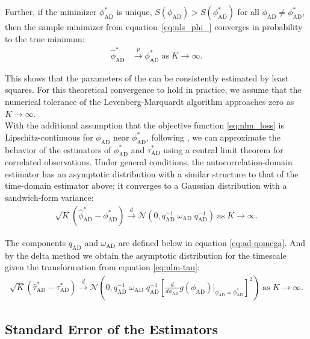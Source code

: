 \documentclass[9pt]{article}
\newcommand{\phiad}{\phi_{\scriptscriptstyle\text{AD}}}
\newcommand{\hatphiad}{\hat{\phi}^*_{\scriptscriptstyle\text{AD}}}
\newcommand{\tauad}{\tau_{\scriptscriptstyle\text{AD}}}
\newcommand{\hattauad}{\hat{\tau}^*_{\scriptscriptstyle\text{AD}}}
\newcommand{\qad}{q_{\scriptscriptstyle\text{AD}}}
\newcommand{\omegaad}{\omega_{\scriptscriptstyle\text{AD}}}
\begin{document}
\noindent Further, if the minimizer $\phiad^*$ is unique, $S(\phiad) > S(\phiad^*)$ for all $\phiad \ne \phiad^*$, then the sample minimizer from equation~\eqref{eq:nls_phi_} converges in probability to the true minimum:
\begin{align}
\hatphiad &\overset{p}{\to} \phiad^* \;\text{as}\;K\to\infty.
\end{align}

\noindent This shows that the parameters of the  can be consistently estimated by least squares. For this theoretical convergence to hold in practice, we assume that the numerical tolerance of the Levenberg-Marquardt algorithm approaches zero as $K \to \infty$.\\

With the additional assumption that the objective function \eqref{eq:nlm_loss} is Lipschitz-continuous for $\phiad$ near $\phiad^*$, following \citet[Theorem~23.2]{hansen_econometrics_2022}, we can approximate the behavior of the estimators of $\phiad^*$ and $\tauad^*$ using a central limit theorem for correlated observations. Under general conditions, the autocorrelation-domain estimator has an asymptotic distribution with a similar structure to that of the time-domain estimator above; it converges to a Gaussian distribution with a sandwich-form variance:
\begin{align}\label{eq:nls-phi-clt}
    \sqrt{K}(\hatphiad - \phiad^*) \overset{d}{\to} \mathcal{N}(0, \qad^{-1}\; \omegaad \;\qad^{-1}) \;\text{as}\;K\to\infty.
\end{align}

\noindent The components $\qad$ and $\omegaad$ are defined below in equation \eqref{eq:ad-qomega}. And by the delta method we obtain the asymptotic distribution for the timescale given the transformation from equation \eqref{eq:nlm-tau}:
\begin{align}
    \sqrt{K}(\hattauad - \tauad^*) \overset{d}{\to} \mathcal{N}(0, \qad^{-1}\; \omegaad \; \qad^{-1} \left[\frac{d}{d\phiad} g(\phiad)\big|_{\phiad=\phiad^*}\right]^2)\;\text{as}\;K\to\infty.
\end{align}

\subsection{Standard Error of the Estimators}\label{sec:stderr}
\end{document}
